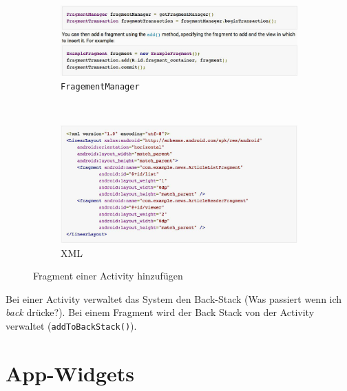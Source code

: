 \begin{figure}
	\centering
	\begin{subfigure}[b]{0.48\textwidth}
		\includegraphics[width=\textwidth]{fig/fragement-activity-code}
		\caption{\texttt{FragementManager}}
	\end{subfigure}
	~
	\begin{subfigure}[b]{0.48\textwidth}
		\includegraphics[width=\textwidth]{fig/fragement-activity-xml}
		\caption{XML}
	\end{subfigure}
	\caption{Fragment einer Activity hinzufügen}
	\label{fig:fragement-activity}
\end{figure}

Bei einer Activity verwaltet das System den Back-Stack (Was passiert wenn ich \emph{back} drücke?). Bei einem Fragment wird der Back Stack von der Activity verwaltet (\texttt{addToBackStack()}).

\section{App-Widgets}

